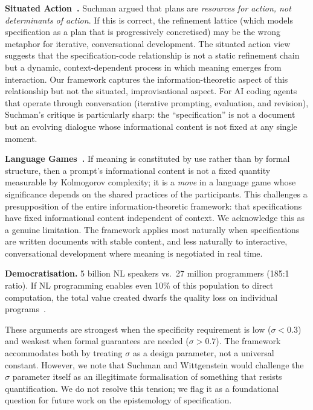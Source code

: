 \documentclass[11pt, a4paper, copyright]{googledeepmind}
\begin{document}
\textbf{Situated Action~\citep{suchman1987plans}.} Suchman argued that plans are \emph{resources for action, not determinants of action}. If this is correct, the refinement lattice (which models specification as a plan that is progressively concretised) may be the wrong metaphor for iterative, conversational development. The situated action view suggests that the specification-code relationship is not a static refinement chain but a dynamic, context-dependent process in which meaning emerges from interaction. Our framework captures the information-theoretic aspect of this relationship but not the situated, improvisational aspect. For AI coding agents that operate through conversation (iterative prompting, evaluation, and revision), Suchman's critique is particularly sharp: the ``specification'' is not a document but an evolving dialogue whose informational content is not fixed at any single moment.

\textbf{Language Games~\citep{wittgenstein1953philosophical}.} If meaning is constituted by use rather than by formal structure, then a prompt's informational content is not a fixed quantity measurable by Kolmogorov complexity; it is a \emph{move} in a language game whose significance depends on the shared practices of the participants. This challenges a presupposition of the entire information-theoretic framework: that specifications have fixed informational content independent of context. We acknowledge this as a genuine limitation. The framework applies most naturally when specifications are written documents with stable content, and less naturally to interactive, conversational development where meaning is negotiated in real time.

\textbf{Democratisation.} 5 billion NL speakers vs.\ 27 million programmers (185:1 ratio). If NL programming enables even 10\% of this population to direct computation, the total value created dwarfs the quality loss on individual programs~\citep{litt2023malleable, altman2024intelligence}.

These arguments are strongest when the specificity requirement is low ($\sigma < 0.3$) and weakest when formal guarantees are needed ($\sigma > 0.7$). The framework accommodates both by treating $\sigma$ as a design parameter, not a universal constant. However, we note that Suchman and Wittgenstein would challenge the $\sigma$ parameter itself as an illegitimate formalisation of something that resists quantification. We do not resolve this tension; we flag it as a foundational question for future work on the epistemology of specification.
\end{document}
